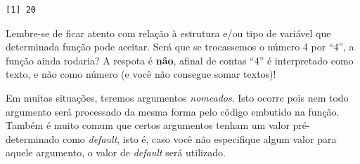 \documentclass[
  letterpaper,
  DIV=11,
  numbers=noendperiod]{scrreprt}
\newenvironment{Shaded}{\begin{snugshade}}{\end{snugshade}}
\newcommand{\ControlFlowTok}[1]{\textcolor[rgb]{0.00,0.23,0.31}{#1}}
\newcommand{\DecValTok}[1]{\textcolor[rgb]{0.68,0.00,0.00}{#1}}
\newcommand{\FunctionTok}[1]{\textcolor[rgb]{0.28,0.35,0.67}{#1}}
\newcommand{\NormalTok}[1]{\textcolor[rgb]{0.00,0.23,0.31}{#1}}
\newcommand{\SpecialCharTok}[1]{\textcolor[rgb]{0.37,0.37,0.37}{#1}}
\newcommand{\StringTok}[1]{\textcolor[rgb]{0.13,0.47,0.30}{#1}}
\begin{document}
\begin{tcolorbox}
\begin{verbatim}
[1] 20
\end{verbatim}

Lembre-se de ficar atento com relação à estrutura e/ou tipo de variável
que determinada função pode aceitar. Será que se trocassemos o número 4
por ``4'', a função ainda rodaria? A respota é \textbf{não}, afinal de
contas ``4'' é interpretado como texto, e não como número (e você não
consegue somar textos)!

\begin{Shaded}
\end{Shaded}

\end{tcolorbox}

Em muitas situações, teremos argumentos \emph{nomeados}. Isto ocorre
pois nem todo argumento será processado da mesma forma pelo código
embutido na função. Também é muito comum que certos argumentos tenham um
valor pré-determinado como \emph{default}, isto é, caso você não
especifique algum valor para aquele argumento, o valor de \emph{default}
será utilizado.
\end{document}
